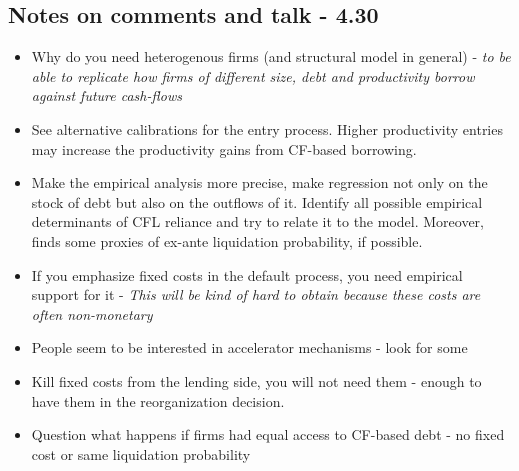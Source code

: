 \documentclass[12pt]{article}
\begin{document}
\subsection*{Notes on comments and talk - 4.30}
\begin{itemize} \setlength\itemsep{0em} \small
    \item Why do you need heterogenous firms (and structural model in general) - \textit{to be able to replicate how firms of different size, debt and productivity borrow against future cash-flows}
    \item See alternative calibrations for the entry process. Higher productivity entries may increase the productivity gains from CF-based borrowing. 
    \item Make the empirical analysis more precise, make regression not only on the stock of debt but also on the outflows of it. Identify all possible empirical determinants of CFL reliance and try to relate it to the model. Moreover, finds some proxies of ex-ante liquidation probability, if possible. 
    \item If you emphasize fixed costs in the default process, you need empirical support for it - \textit{This will be kind of hard to obtain because these costs are often non-monetary}
    \item People seem to be interested in accelerator mechanisms - look for some 
    \item Kill fixed costs from the lending side, you will not need them - enough to have them in the reorganization decision. 
    \item Question what happens if firms had equal access to CF-based debt - no fixed cost or same liquidation probability
\end{itemize} \normalsize
\end{document}
